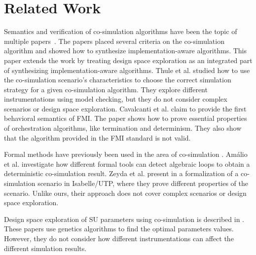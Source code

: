 \section{Related Work}\label{sc:related}
Semantics and verification of co-simulation algorithms have been the topic of multiple papers~\cite{Gomes2019c,Gomes2019a,Broman2013,thrane2021,sampaio_behavioural_2016}. 
The papers \cite{thrane2021} placed several criteria on the co-simulation algorithm and showed how to synthesize implementation-aware algorithms.
This paper extends the work by treating design space exploration as an integrated part of synthesizing implementation-aware algorithms. 
Thule et al. \cite{Thule_2018} studied how to use the co-simulation scenario's characteristics to choose the correct simulation strategy for a given co-simulation algorithm.
They explore different instrumentations using model checking, but they do not consider complex scenarios or design space exploration.
Cavalcanti et al. \cite{sampaio_behavioural_2016} claim to provide the first behavioral semantics of FMI. 
The paper shows how to prove essential properties of orchestration algorithms, like termination and determinism. 
They also show that the algorithm provided in the FMI standard is not valid. 

Formal methods have previously been used in the area of co-simulation \cite{Amalio2016,sampaio_behavioural_2016,cerone_formalising_2018,hansen_verification_2021}.
Amálio et al. \cite{Amalio2016} investigate how different formal tools can detect algebraic loops to obtain a deterministic co-simulation result. 
Zeyda et al. present in \cite{cerone_formalising_2018} a formalization of a co-simulation scenario in Isabelle/UTP, where they prove different properties of the scenario.
Unlike ours, their approach does not cover complex scenarios or design space exploration.

Design space exploration of SU parameters using co-simulation is described in \cite{dse,gamble_design_2014}.
These papers use genetics algorithms to find the optimal parameters values.
However, they do not consider how different instrumentations can affect the different simulation results.

